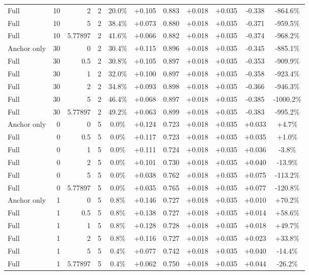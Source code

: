 \begin{table}[htbp]
\begin{tabular}{lrrrccccccc}
Full & 10 & 2 & 2 & 20.0\% & +0.105 & 0.883 & +0.018 & +0.035 & -0.338 & -864.6\% \\
Full & 10 & 5 & 2 & 38.4\% & +0.073 & 0.880 & +0.018 & +0.035 & -0.371 & -959.5\% \\
Full & 10 & 5.77897 & 2 & 41.6\% & +0.066 & 0.882 & +0.018 & +0.035 & -0.374 & -968.2\% \\
Anchor only & 30 & 0 & 2 & 30.4\% & +0.115 & 0.896 & +0.018 & +0.035 & -0.345 & -885.1\% \\
Full & 30 & 0.5 & 2 & 30.8\% & +0.105 & 0.897 & +0.018 & +0.035 & -0.353 & -909.9\% \\
Full & 30 & 1 & 2 & 32.0\% & +0.100 & 0.897 & +0.018 & +0.035 & -0.358 & -923.4\% \\
Full & 30 & 2 & 2 & 34.8\% & +0.093 & 0.898 & +0.018 & +0.035 & -0.366 & -946.3\% \\
Full & 30 & 5 & 2 & 46.4\% & +0.068 & 0.897 & +0.018 & +0.035 & -0.385 & -1000.2\% \\
Full & 30 & 5.77897 & 2 & 49.2\% & +0.063 & 0.899 & +0.018 & +0.035 & -0.383 & -995.2\% \\
Anchor only & 0 & 0 & 5 & 0.0\% & +0.124 & 0.723 & +0.018 & +0.035 & +0.033 & +4.7\% \\
Full & 0 & 0.5 & 5 & 0.0\% & +0.117 & 0.723 & +0.018 & +0.035 & +0.035 & +1.0\% \\
Full & 0 & 1 & 5 & 0.0\% & +0.111 & 0.724 & +0.018 & +0.035 & +0.036 & -3.8\% \\
Full & 0 & 2 & 5 & 0.0\% & +0.101 & 0.730 & +0.018 & +0.035 & +0.040 & -13.9\% \\
Full & 0 & 5 & 5 & 0.0\% & +0.038 & 0.762 & +0.018 & +0.035 & +0.075 & -113.2\% \\
Full & 0 & 5.77897 & 5 & 0.0\% & +0.035 & 0.765 & +0.018 & +0.035 & +0.077 & -120.8\% \\
Anchor only & 1 & 0 & 5 & 0.8\% & +0.146 & 0.727 & +0.018 & +0.035 & +0.010 & +70.2\% \\
Full & 1 & 0.5 & 5 & 0.8\% & +0.138 & 0.727 & +0.018 & +0.035 & +0.014 & +58.6\% \\
Full & 1 & 1 & 5 & 0.8\% & +0.128 & 0.728 & +0.018 & +0.035 & +0.018 & +49.7\% \\
Full & 1 & 2 & 5 & 0.8\% & +0.116 & 0.727 & +0.018 & +0.035 & +0.023 & +33.8\% \\
Full & 1 & 5 & 5 & 0.4\% & +0.077 & 0.742 & +0.018 & +0.035 & +0.040 & -14.4\% \\
Full & 1 & 5.77897 & 5 & 0.4\% & +0.062 & 0.750 & +0.018 & +0.035 & +0.044 & -26.2\% \\

\end{tabular}
\end{table}
